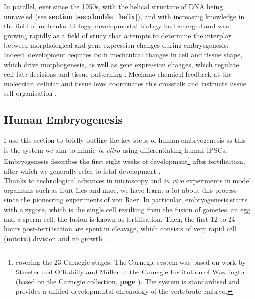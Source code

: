 In parallel, ever since the 1950s, with the helical structure of DNA being unraveled (see \textbf{section \ref{sec:double_helix}}), and with increasing knowledge in the field of molecular biology, developmental biology had emerged and was growing rapidly as a field of study
that attempts to determine the interplay between morphological and gene expression changes during embryogenesis.
Indeed, development requires both mechanical changes in cell and tissue shape, which drive morphogenesis, as well as gene expression changes, which regulate cell fate decisions and tissue patterning \cite{niakan2013analysis, petropoulos2016single}. 
Mechano-chemical feedback at the molecular, cellular and tissue level coordinates this crosstalk and instructs tissue self-organisation \cite{hannezo2019mechanochemical}.

\newpage

\subsection{Human Embryogenesis}
\label{sec:human_embryogenesis}


I use this section to briefly outline the key steps of human embryogenesis as this is the system we aim to mimic \textit{in vitro} using differentiating human iPSCs.
Embryogenesis describes the first eight weeks of development\footnote{covering the 23 Carnegie stages.
The Carnegie system was based on work by Streeter \cite{streeter1942developmental} and O'Rahilly and Müller \cite{o1973developmental, o2010developmental} at the Carnegie Institution of Washington (based on the Carnegie collection, \textbf{page \pageref{sec:carnegie_collection}}).
The system is standardised and provides a unified developmental chronology of the vertebrate embryo.} after fertilisation, after which we generally refer to fetal development \cite{gilbert2008developmental}.\\

Thanks to technological advances in microscopy and \textit{in vivo} experiments in model organisms such as fruit flies and mice, we have learnt a lot about this process since the pioneering experiments of von Baer.
In particular, embryogenesis starts with a zygote, which is the single cell resulting from the fusion of gametes, an egg and a sperm cell; the fusion is known as fertilisation.
Then, the first 12-to-24 hours post-fertilisation are spent in cleavage, which consists of very rapid cell (mitotic) division and no growth \cite{khan2015human}.\\

